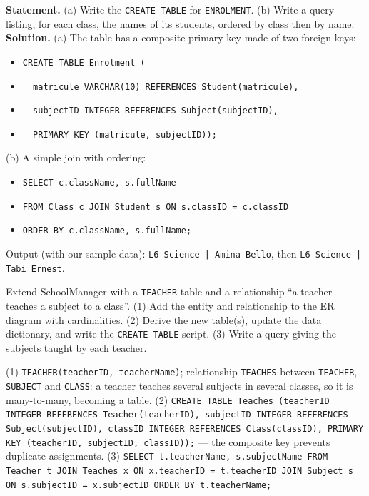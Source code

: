 \documentclass[11pt]{article}
\begin{document}
\begin{exoresolu}
\textbf{Statement.} (a) Write the \texttt{CREATE TABLE} for \texttt{ENROLMENT}. (b) Write a query listing, for each class, the names of its students, ordered by class then by name.
\tcblower
\textbf{Solution.} (a) The table has a composite primary key made of two foreign keys:
\begin{itemize}
\item \texttt{CREATE TABLE Enrolment (}
\item \texttt{\ \ matricule VARCHAR(10) REFERENCES Student(matricule),}
\item \texttt{\ \ subjectID INTEGER REFERENCES Subject(subjectID),}
\item \texttt{\ \ PRIMARY KEY (matricule, subjectID));}
\end{itemize}
(b) A simple join with ordering:
\begin{itemize}
\item \texttt{SELECT c.className, s.fullName}
\item \texttt{FROM Class c JOIN Student s ON s.classID = c.classID}
\item \texttt{ORDER BY c.className, s.fullName;}
\end{itemize}
Output (with our sample data): \texttt{L6 Science | Amina Bello}, then \texttt{L6 Science | Tabi Ernest}.
\end{exoresolu}

\begin{exercice}
Extend SchoolManager with a \texttt{TEACHER} table and a relationship ``a teacher teaches a subject to a class''. (1) Add the entity and relationship to the ER diagram with cardinalities. (2) Derive the new table(s), update the data dictionary, and write the \texttt{CREATE TABLE} script. (3) Write a query giving the subjects taught by each teacher.
\end{exercice}

\begin{corrige}[Exercise 1]
(1) \texttt{TEACHER(teacherID, teacherName)}; relationship \texttt{TEACHES} between \texttt{TEACHER}, \texttt{SUBJECT} and \texttt{CLASS}: a teacher teaches several subjects in several classes, so it is many-to-many, becoming a table. (2) \texttt{CREATE TABLE Teaches (teacherID INTEGER REFERENCES Teacher(teacherID), subjectID INTEGER REFERENCES Subject(subjectID), classID INTEGER REFERENCES Class(classID), PRIMARY KEY (teacherID, subjectID, classID));} — the composite key prevents duplicate assignments. (3) \texttt{SELECT t.teacherName, s.subjectName FROM Teacher t JOIN Teaches x ON x.teacherID = t.teacherID JOIN Subject s ON s.subjectID = x.subjectID ORDER BY t.teacherName;}
\end{corrige}
\end{document}
